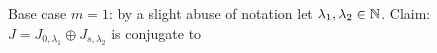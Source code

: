 \documentclass[draft]{article}
\begin{document}
\begin{itemize}
    \begin{remark}
        Base case $m = 1$: by a slight abuse of notation let $\lambda_1, \lambda_2 \in \mathbb N$. Claim: $J=J_{0,\lambda_1} \oplus J_{s,\lambda_2}$ is conjugate to 
        
\begin{comment}
\[
        A = \begin{bNiceArray}{ccc|ccc}[columns-width = auto,first-row,last-col,code-for-first-row = \color{blue}\scriptstyle\rotate,code-for-last-col = \color{blue}\scriptstyle,nullify-dots,xdots/line-style=loosely dotted]
        1 & \Cdots & \lambda_1 & \lambda_1 + 1 & \Cdots & \lambda_1 + \lambda_2 \\
        0 & 1 & 0 & 0 & 0 & 0 & 1\\
        0 & \Ddots & 1 & 0 & 0 & 0 & \Vdots \\
        0 & 0 & 0 & 1 & 0 & 0 & \lambda_1 \\
        \hline
         & & & s & 1 & 0 & \lambda_1 + 1 \\
         & & & 0 & \Ddots & 1 & \Vdots \\
         & & & 0 & 0 & s & \lambda_1 + \lambda_2 
        \end{bNiceArray} 
\]
\end{comment}



\end{remark}
\end{itemize}
\end{document}
